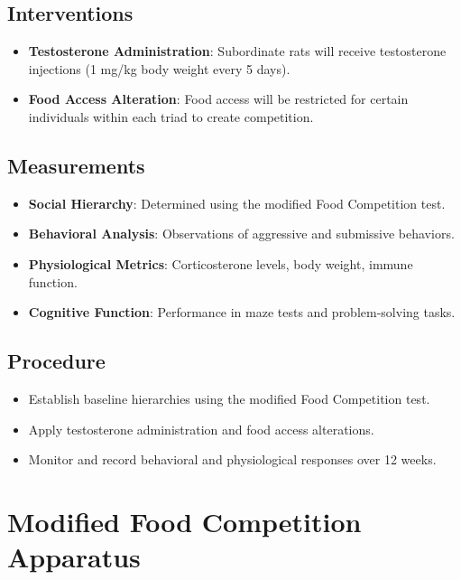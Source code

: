 \documentclass[english, a4paper, 11pt]{article}
\begin{document}
\subsection*{Interventions}
\begin{itemize}
    \item \textbf{Testosterone Administration}: Subordinate rats will receive testosterone injections (1 mg/kg body weight every 5 days).
    \item \textbf{Food Access Alteration}: Food access will be restricted for certain individuals within each triad to create competition.
\end{itemize}

\subsection*{Measurements}
\begin{itemize}
    \item \textbf{Social Hierarchy}: Determined using the modified Food Competition test.
    \item \textbf{Behavioral Analysis}: Observations of aggressive and submissive behaviors.
    \item \textbf{Physiological Metrics}: Corticosterone levels, body weight, immune function.
    \item \textbf{Cognitive Function}: Performance in maze tests and problem-solving tasks.
\end{itemize}

\subsection*{Procedure}
\begin{itemize}
    \item Establish baseline hierarchies using the modified Food Competition test.
    \item Apply testosterone administration and food access alterations.
    \item Monitor and record behavioral and physiological responses over 12 weeks.
\end{itemize}

\section*{Modified Food Competition Apparatus}
\end{document}
